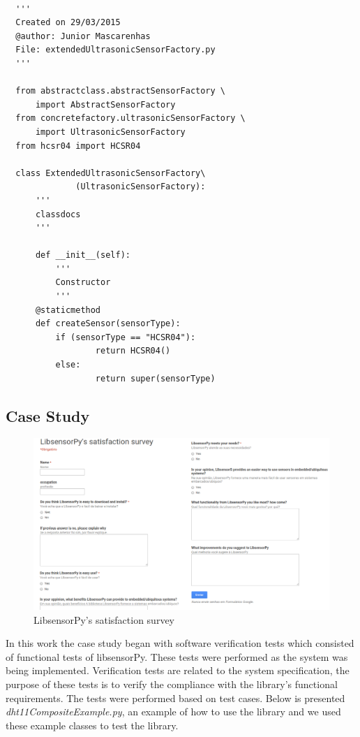 \documentclass{acm_proc_article-sp}
\begin{document}
\renewcommand{\theFancyVerbLine}{
  \sffamily\textcolor[rgb]{0.5,0.5,0.5}{\scriptsize\arabic{FancyVerbLine}}}
\begin{verbatim}

  '''
  Created on 29/03/2015
  @author: Junior Mascarenhas
  File: extendedUltrasonicSensorFactory.py
  '''

  from abstractclass.abstractSensorFactory \
      import AbstractSensorFactory
  from concretefactory.ultrasonicSensorFactory \
      import UltrasonicSensorFactory
  from hcsr04 import HCSR04

  class ExtendedUltrasonicSensorFactory\
              (UltrasonicSensorFactory):
      '''
      classdocs
      '''

      def __init__(self):
          '''
          Constructor
          '''
      @staticmethod
      def createSensor(sensorType):
          if (sensorType == "HCSR04"):
                  return HCSR04()
          else:
                  return super(sensorType)
\end{verbatim}

\subsection{Case Study}
\begin{figure}[t]
    \centering
    	\includegraphics[width=1.0\textwidth]{pictures/survey2.png}
    		\caption{LibsensorPy's satisfaction survey}  
    		\label{fig:survey}  	
\end{figure}
In this work the case study began with software verification tests which consisted of functional tests of libsensorPy. These tests were performed as the system was being implemented.
\newline
\newline
Verification tests are related to the system specification, the purpose of these tests is to verify the compliance with the library's functional requirements. The tests were performed based on test cases.
\newline
\newline
Below is presented \textit{dht11CompositeExample.py}, an example of how to use the library and we used these example classes to test the library.
\end{document}
